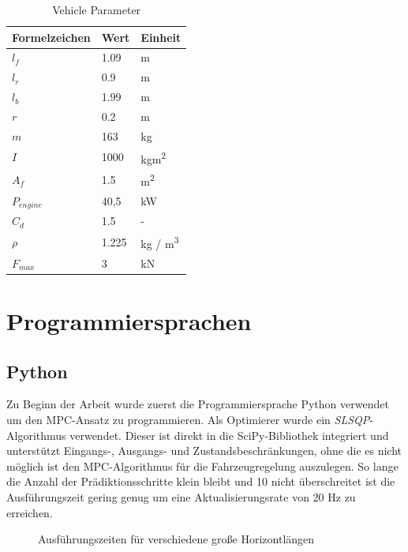 \documentclass{like}
\begin{document}
\begin{table}[]
	\centering
	\begin{tabular}{l|l|l}
		\hline
		Formelzeichen	& Wert & Einheit \\ \hline
		\(l_f\)	&	1.09 & m\\
		\(l_r\)	&	0.9 & m\\
		\(l_b\)	&	1.99 & m \\
		\(r\)	&	0.2 & m \\
		\(m\)	&  	163 & kg\\
		\(I\)	&  	1000 & kgm\textsuperscript{2}\\
		\(A_f\)	&  	1.5 & m\textsuperscript{2}\\
		\(P_{engine}\) &  40,5 & kW\\
		\(C_d\)	&  	1.5 & - \\
		\(\rho\)	&  	1.225 & kg / m\textsuperscript{3}\\
		\(F_{max}\)	&  	3 & kN \\ 
	\end{tabular}
	\caption{Vehicle Parameter}
	\label{vehicleParam}
\end{table}





\section{Programmiersprachen}
\subsection{Python}

Zu Beginn der Arbeit wurde zuerst die Programmiersprache Python verwendet um den \ac{MPC}-Ansatz zu programmieren. Als Optimierer wurde ein \emph{\ac{SLSQP}}-Algorithmus verwendet. Dieser ist direkt in die SciPy-Bibliothek integriert und unterstützt Eingangs-, Ausgangs- und Zustandsbeschränkungen, ohne die es nicht möglich ist den \ac{MPC}-Algorithmus für die Fahrzeugregelung auszulegen. So lange die Anzahl der Prädiktionsschritte klein bleibt und 10 nicht überschreitet ist die Ausführungszeit gering genug um eine Aktualisierungsrate von 20 Hz zu erreichen. 

\begin{figure}[ht!]
	\centering
	 
	\caption{Ausführungszeiten für verschiedene  große Horizontlängen}
	\label{fig:pythonBench}
\end{figure}
\end{document}
